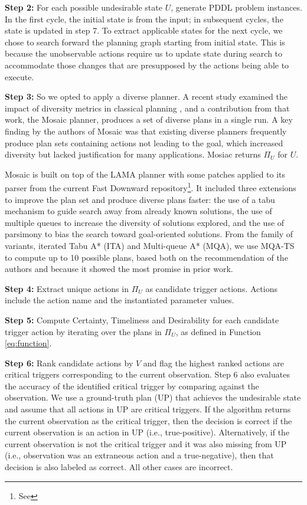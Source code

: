 \textbf{Step 2:} For each possible undesirable state $U$, generate PDDL problem instances. In the first cycle, the initial state is from the input; in subsequent cycles, the state is updated in step 7. To extract applicable states for the next cycle, we chose to search forward the planning graph starting from initial state. This is because the unobservable actions require us to update state during search to accommodate those changes that are presupposed by the actions being able to execute. 

\textbf{Step 3:}
So we opted to apply a diverse planner.  A recent study examined the impact of diversity metrics in classical planning  \cite{roberts2014}, and a contribution from that work, the Mosaic planner, produces a set of diverse plans in a single run. A key finding by the authors of Mosaic was that existing diverse planners frequently produce plan sets containing actions not leading to the goal, which increased diversity but lacked justification for many applications. Mosiac returns $\Pi_U$ for $U$. 

Mosaic is built on top of the LAMA planner \cite{richterWestphal10.jair.LAMA}  with some patches applied to its parser from the current Fast Downward repository\footnote{See }. It included three extensions to improve the plan set and produce diverse plans faster: the use of a tabu mechanism to guide search away from already known solutions, the use of multiple queues to increase the diversity of solutions explored, and the use of parsimony to bias the search toward goal-oriented solutions. From the family of variants, iterated Tabu A* (ITA) and Multi-queue A* (MQA), we use MQA-TS to compute up to 10 possible plans, based both on the recommendation of the authors and because it showed the most promise in prior work. 

\textbf{Step 4:} Extract unique actions in $\Pi_U$ as candidate trigger actions. Actions include the action name and the instantiated parameter values.

\textbf{Step 5:} Compute Certainty, Timeliness and Desirability for each candidate trigger action by iterating over the plans in $\Pi_U$, as defined in Function \ref{eq:function}. 

\textbf{Step 6:} Rank candidate actions by $V$ and flag the highest ranked actions are critical triggers corresponding to the current observation. Step 6 also evaluates the accuracy of the identified critical trigger by comparing against the observation. We use a ground-truth plan (UP) that achieves the undesirable state and assume that all actions in UP are critical triggers. If the algorithm returns the current observation as the critical trigger, then the decision is correct if the current observation is an action in UP (i.e., true-positive). Alternatively, if the current observation is not the critical trigger and it was also missing from UP (i.e., observation was an extraneous action and a true-negative), then that decision is also labeled as correct. All other cases are incorrect.

